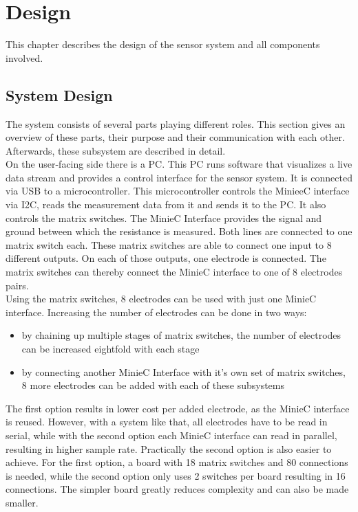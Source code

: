 \chapter{Design}

This chapter describes the design of the sensor system and all components involved. \\

\section{System Design}

The system consists of several parts playing different roles. This section gives an overview of these parts, their purpose and their communication with each other. Afterwards, these subsystem are described in detail. \\

On the user-facing side there is a PC. This PC runs software that visualizes a live data stream and provides a control interface for the sensor system. It is connected via USB to a microcontroller. This microcontroller controls the MinieeC interface via I2C, reads the measurement data from it and sends it to the PC. It also controls the matrix switches. The MinieC Interface provides the signal and ground between which the resistance is measured. Both lines are connected to one matrix switch each. These matrix switches are able to connect one input to 8 different outputs. On each of those outputs, one electrode is connected. The matrix switches can thereby connect the MinieC interface to one of 8 electrodes pairs. \\

Using the matrix switches, 8 electrodes can be used with just one MinieC interface. Increasing the number of electrodes can be done in two ways:

\begin{itemize}
    \item by chaining up multiple stages of matrix switches, the number of electrodes can be increased eightfold with each stage
    \item by connecting another MinieC Interface with it's own set of matrix switches, 8 more electrodes can be added with each of these subsystems
\end{itemize}

The first option results in lower cost per added electrode, as the MinieC interface is reused. However, with a system like that, all electrodes have to be read in serial, while with the second option each MinieC interface can read in parallel, resulting in higher sample rate. Practically the second option is also easier to achieve. For the first option, a board with 18 matrix switches and 80 connections is needed, while the second option only uses 2 switches per board resulting in 16 connections. The simpler board greatly reduces complexity and can also be made smaller.

